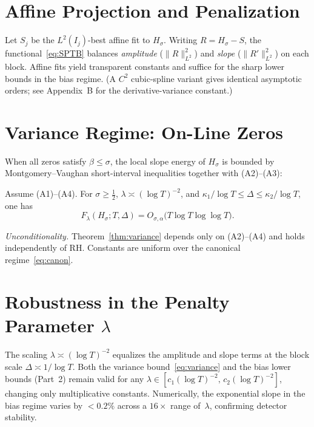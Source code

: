 \section{Affine Projection and Penalization}

Let $S_j$ be the $L^2(I_j)$-best affine fit to $H_\sigma$.
Writing $R = H_\sigma - S$, the functional~\eqref{eq:SPTB}
balances \emph{amplitude} ($\|R\|_{L^2}^2$) and \emph{slope} ($\|R'\|_{L^2}^2$)
on each block.  Affine fits yield transparent constants and suffice
for the sharp lower bounds in the bias regime.
(A $C^2$ cubic-spline variant gives identical asymptotic orders; see
Appendix~B for the derivative-variance constant.)

\section{Variance Regime: On-Line Zeros}

When all zeros satisfy $\beta\le\sigma$, the local slope energy of $H_\sigma$
is bounded by Montgomery–Vaughan short-interval inequalities together with
(A2)–(A3):

\begin{theorem}\label{thm:variance}
Assume \textup{(A1)–(A4)}.
For $\sigma\ge\tfrac12$, $\lambda\asymp(\log T)^{-2}$, and
$\kappa_1/\log T \le \Delta \le \kappa_2/\log T$, one has
\begin{equation}
F_\lambda(H_\sigma;T,\Delta)
  = O_{\sigma,\alpha}\!\bigl(T\log T\log\log T\bigr).
\label{eq:variance}
\tag{1.3}
\end{equation}
\end{theorem}

\noindent\emph{Unconditionality.}
Theorem~\ref{thm:variance} depends only on (A2)–(A4) and holds independently
of RH.  Constants are uniform over the canonical regime~\eqref{eq:canon}.

\section{Robustness in the Penalty Parameter \texorpdfstring{$\lambda$}{lambda}}

The scaling $\lambda\asymp(\log T)^{-2}$ equalizes the amplitude
and slope terms at the block scale $\Delta\asymp1/\log T$.
Both the variance bound~\eqref{eq:variance} and the bias lower bounds
(Part~2) remain valid for any
$\lambda\in[c_1(\log T)^{-2},\,c_2(\log T)^{-2}]$,
changing only multiplicative constants.
Numerically, the exponential slope in the bias regime varies by $<0.2\%$
across a $16\times$ range of~$\lambda$, confirming detector stability.

